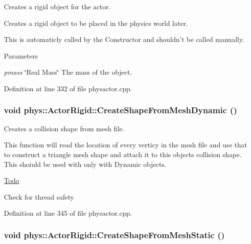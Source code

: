 Creates a rigid object for the actor. 

Creates a rigid object to be placed in the physics world later. \par
 This is automaticly called by the Constructor and shouldn't be called manually. 
\begin{DoxyParams}{Parameters}
\item[{\em pmass}]\char`\"{}Real Mass\char`\"{} The mass of the object. \end{DoxyParams}


Definition at line 332 of file physactor.cpp.

\hypertarget{classphys_1_1ActorRigid_a067d5beab7602bbc3de852b9b8332113}{
\subsubsection[{CreateShapeFromMeshDynamic}]{\setlength{\rightskip}{0pt plus 5cm}void phys::ActorRigid::CreateShapeFromMeshDynamic ()}}
\label{d8/d71/classphys_1_1ActorRigid_a067d5beab7602bbc3de852b9b8332113}


Creates a collision shape from mesh file. 

This function will read the location of every verticy in the mesh file and use that to construct a triangle mesh shape and attach it to this objects collision shape. This shoiuld be used with only with Dynamic objects. 

\begin{Desc}
\item[\hyperlink{todo__todo000011}{Todo}]
\begin{DoxyItemize}
\item Check for thread safety 
\end{DoxyItemize}\end{Desc}




Definition at line 345 of file physactor.cpp.

\hypertarget{classphys_1_1ActorRigid_a84554dcaaf2475ba0ec7dcb9235050ac}{
\subsubsection[{CreateShapeFromMeshStatic}]{\setlength{\rightskip}{0pt plus 5cm}void phys::ActorRigid::CreateShapeFromMeshStatic ()}}
\label{d8/d71/classphys_1_1ActorRigid_a84554dcaaf2475ba0ec7dcb9235050ac}


